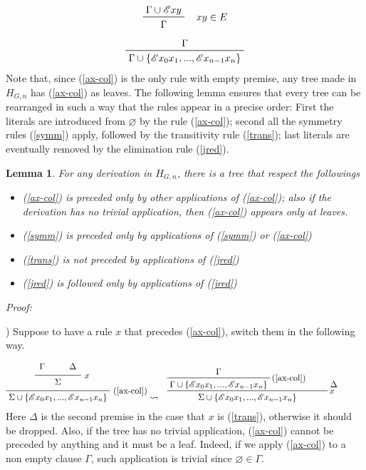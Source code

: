 \documentclass[a4paper,12pt,oneside]{book}
\newtheorem{lemma}[theorem]{Lemma}
\newcommand{\E}{\mathscr{E}}
\let\emptyset\varnothing
\begin{document}
\begin{equation}
\label{jred}
\prftree[r]{$\quad xy \in E $}{\Gamma \cup \E xy }{ \Gamma}
\end{equation}
\begin{equation}
 \label{ax-col}
\prftree{\Gamma}{ \Gamma \cup \{\E x_0 x_1 , ... , \E x_{n-1} x_n  \}}
\end{equation}
Note that, since (\ref{ax-col}) is the only rule with empty premise, any tree made in $H_{G,n}$  has (\ref{ax-col}) as leaves. The following lemma ensures that every tree can be rearranged in such a way that the rules appear in a precise order: First the literals are introduced from $\emptyset$ by the rule (\ref{ax-col}); second all the symmetry rules (\ref{symm}) apply, followed by the transitivity rule (\ref{trans}); last literals are eventually removed by the elimination rule (\ref{jred}).


\begin{lemma}\label{lemma_rules}
For any derivation in $H_{G,n}$, there is a tree that respect the followings
\begin{itemize}
\item[1)] (\ref{ax-col}) is preceded only by other applications of (\ref{ax-col}); also if the derivation has no trivial application, then (\ref{ax-col}) appears only at leaves.
\item[2)] (\ref{symm}) is preceded only by applications of (\ref{symm}) or (\ref{ax-col})
\item[3)] (\ref{trans}) is not preceded by  applications of (\ref{jred})
\item[4)] (\ref{jred}) is followed only by  applications of (\ref{jred})
\end{itemize}\end{lemma}
\noindent\emph{Proof:}

) Suppose to have a rule $x$ that precedes (\ref{ax-col}), switch them in the following way. 

\begin{eqnarray*}
\prfrulenameskip=0.4em\prflinepadbefore=1ex
\prftree[r]{(\ref{ax-col})}{
\prftree[r]{$x$}{\Gamma}{\qquad\Delta}{\qquad\Sigma\qquad}
}{\Sigma\cup\{\E x_0 x_1 , ... , \E x_{n-1} x_n  \}}
& \leadsto
&\prftree[r]{$x$}{
\prftree[r]{(\ref{ax-col})}{\Gamma}{\Gamma\cup\{\E x_0 x_1 , ... , \E x_{n-1} x_n  \}}
}{\qquad\Delta\qquad\quad}{\Sigma\cup\{\E x_0 x_1 , ... , \E x_{n-1} x_n  \}}
 \end{eqnarray*}
Here $\Delta$ is the second premise in the case that $x$ is (\ref{trans}), otherwise it should be dropped. Also, if the tree has  no trivial application, (\ref{ax-col}) cannot be preceded by anything and it must be a leaf. Indeed, if we apply (\ref{ax-col}) to a non empty clause $\Gamma$, such application is trivial since $\emptyset\in\Gamma$.
 
\end{document}
